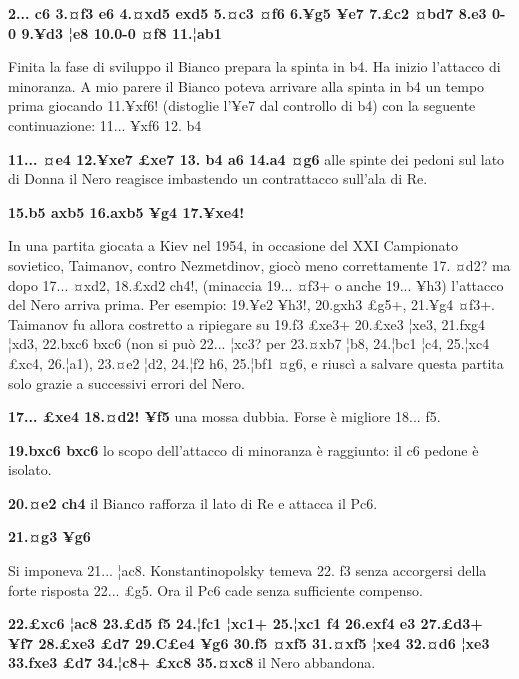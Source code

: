 \textbf{2... c6 3.¤f3 e6 4.¤xd5 exd5 5.¤c3 ¤f6 6.¥g5 ¥e7 7.£c2 ¤bd7 8.e3
0-0 9.¥d3 ¦e8 10.0-0 ¤f8 11.¦ab1}


Finita la fase di sviluppo il Bianco prepara la spinta in b4. Ha inizio
l'attacco di minoranza. A mio parere il Bianco poteva arrivare alla
spinta in b4 un tempo prima giocando 11.¥xf6! (distoglie l'¥e7 dal
controllo di b4) con la seguente continuazione: 11... ¥xf6 12. b4

\textbf{11... ¤e4 12.¥xe7 £xe7 13. b4 a6 14.a4 ¤g6} alle spinte dei
pedoni sul lato di Donna il Nero reagisce imbastendo un contrattacco
sull'ala di Re.

\textbf{15.b5 axb5 16.axb5 ¥g4 17.¥xe4!}


In una partita giocata a Kiev nel 1954, in occasione del XXI Campionato
sovietico, Taimanov, contro Nezmetdinov, giocò meno correttamente 17.
¤d2? ma dopo 17... ¤xd2, 18.£xd2 ch4!, (minaccia 19... ¤f3+ o anche
19... ¥h3) l'attacco del Nero arriva prima. Per esempio: 19.¥e2 ¥h3!,
20.gxh3 £g5+, 21.¥g4 ¤f3+. Taimanov fu allora costretto a ripiegare su
19.f3 £xe3+ 20.£xe3 ¦xe3, 21.fxg4 ¦xd3, 22.bxc6 bxc6 (non si può 22...
¦xc3? per 23.¤xb7 ¦b8, 24.¦bc1 ¦c4, 25.¦xc4 £xc4, 26.¦a1), 23.¤e2 ¦d2,
24.¦f2 h6, 25.¦bf1 ¤g6, e riuscì a salvare questa partita solo grazie a
successivi errori del Nero.

\textbf{17... £xe4 18.¤d2! ¥f5} una mossa dubbia. Forse è migliore 18...
f5.

\textbf{19.bxc6 bxc6} lo scopo dell'attacco di minoranza è raggiunto: il
c6 pedone è isolato.

\textbf{20.¤e2 ch4} il Bianco rafforza il lato di Re e attacca il Pc6.

\textbf{21.¤g3 ¥g6}


Si imponeva 21... ¦ac8. Konstantinopolsky temeva 22. f3 senza accorgersi
della forte risposta 22... £g5. Ora il Pc6 cade senza sufficiente
compenso.

\textbf{22.£xc6 ¦ac8 23.£d5 f5 24.¦fc1 ¦xc1+ 25.¦xc1 f4 26.exf4 e3
27.£d3+ ¥f7 28.£xe3 £d7 29.C£e4 ¥g6 30.f5 ¤xf5 31.¤xf5 ¦xe4 32.¤d6 ¦xe3
33.fxe3 £d7 34.¦c8+ £xc8 35.¤xc8} il Nero abbandona.


